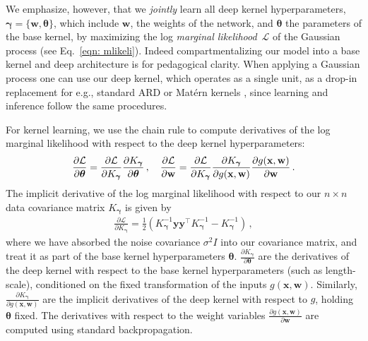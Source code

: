 \documentclass[twoside,11pt]{article}
\newcommand{\mbf}[1]{{\boldsymbol{\mathbf{#1}}}}
\renewcommand{\bm}{\mbf}
\begin{document}
We emphasize, however, that we \emph{jointly} learn all deep kernel hyperparameters,
$\bm{\gamma} = \{ \bm{w},\bm{\theta} \}$,
which include $\bm{w}$, the weights of the
network, and $\bm{\theta}$ the parameters of the base kernel, by maximizing the
log \emph{marginal likelihood}~$\mathcal{L}$ of the Gaussian process (see
Eq.~\eqref{eqn: mlikeli}).  Indeed compartmentalizing our model into a
base kernel and deep architecture is for pedagogical clarity.  When applying
a Gaussian process one can use our deep kernel, which operates as a single
unit, as a drop-in replacement for e.g., standard ARD or Mat\'{e}rn kernels \citep{rasmussen06}, since learning
and inference follow the same procedures.

For kernel learning, we use the chain rule to compute derivatives of the log
marginal likelihood with respect to the deep kernel hyperparameters:
\begin{align}
\label{eq:partial}
\frac{\partial \mathcal{L}}{\partial \bm{\theta}} = \frac{\partial \mathcal{L}}{\partial K_{\bm{\gamma}}} \frac{\partial K_{\bm{\gamma}}}{\partial \bm{\theta}}\,,
\quad \frac{\partial \mathcal{L}}{\partial \bm{w}} = \frac{\partial \mathcal{L}}{\partial K_{\bm{\gamma}}} \frac{ \partial K_{\bm{\gamma}}}{\partial g(\bm{x},\bm{w})}
\frac{\partial g(\bm{x},\bm{w})}{\partial \bm{w}} \,. \notag
\end{align}
The implicit derivative of the log marginal likelihood
with respect to our $n \times n$ data covariance matrix $K_{\bm{\gamma}}$
is given by
\begin{align}
\frac{\partial \mathcal{L}}{\partial K_{\bm{\gamma}}} = \frac{1}{2} (K_{\bm{\gamma}}^{-1} \bm{y}\bm{y}^{\top} K_{\bm{\gamma}}^{-1}
- K_{\bm{\gamma}}^{-1}) \,,
\end{align}
where we have absorbed the noise covariance $\sigma^2 I$ into our covariance
matrix, and treat it as part of the base kernel hyperparameters $\bm{\theta}$.
$\frac{\partial K_{\bm{\gamma}}}{\partial \bm{\theta}}$ are the derivatives of
the deep kernel with respect to the base kernel hyperparameters (such as length-scale),
conditioned on the fixed transformation of the inputs $g(\bm{x},\bm{w})$.  Similarly,
$\frac{ \partial K_{\bm{\gamma}}}{\partial g(\bm{x},\bm{w})}$ are the implicit derivatives
of the deep kernel with respect to $g$, holding $\bm{\theta}$ fixed.  The derivatives
with respect to the weight variables $\frac{\partial g(\bm{x},\bm{w})}{\partial \bm{w}}$ are
computed using standard backpropagation.
\end{document}
